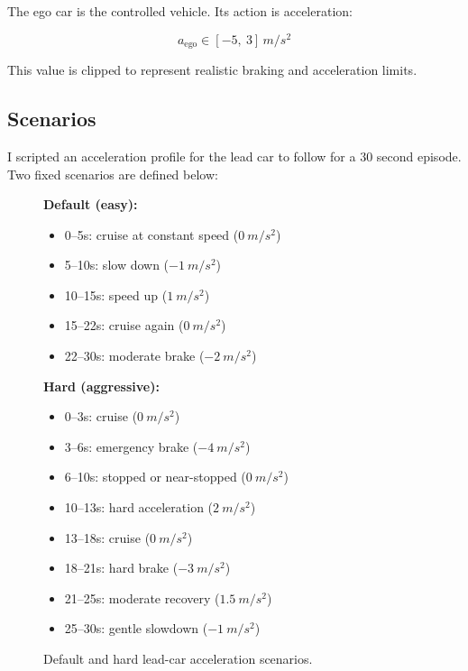 \documentclass{article}
\begin{document}
The ego car is the controlled vehicle. Its action is acceleration:

\[
a_{\text{ego}} \in [-5,\ 3]\,\si{m/s^2}
\]

This value is clipped to represent realistic braking and acceleration limits.

\subsection*{Scenarios}

I scripted an acceleration profile for the lead car to follow for a 30 second episode. Two fixed scenarios are defined below:

\begin{figure}[h]
\centering

\begin{minipage}{0.47\textwidth}
\textbf{Default (easy):}
\begin{itemize}
    \item 0--5s: cruise at constant speed ($\SI{0}{m/s^2}$)
    \item 5--10s: slow down ($\SI{-1}{m/s^2}$)
    \item 10--15s: speed up ($\SI{1}{m/s^2}$)
    \item 15--22s: cruise again ($\SI{0}{m/s^2}$)
    \item 22--30s: moderate brake ($\SI{-2}{m/s^2}$)
\end{itemize}
\end{minipage}
\hfill
\begin{minipage}{0.47\textwidth}
\textbf{Hard (aggressive):}
\begin{itemize}
    \item 0--3s: cruise ($\SI{0}{m/s^2}$)
    \item 3--6s: emergency brake ($\SI{-4}{m/s^2}$)
    \item 6--10s: stopped or near-stopped ($\SI{0}{m/s^2}$)
    \item 10--13s: hard acceleration ($\SI{2}{m/s^2}$)
    \item 13--18s: cruise ($\SI{0}{m/s^2}$)
    \item 18--21s: hard brake ($\SI{-3}{m/s^2}$)
    \item 21--25s: moderate recovery ($\SI{1.5}{m/s^2}$)
    \item 25--30s: gentle slowdown ($\SI{-1}{m/s^2}$)
\end{itemize}
\end{minipage}

\caption{Default and hard lead-car acceleration scenarios.}
\end{figure}
\end{document}
